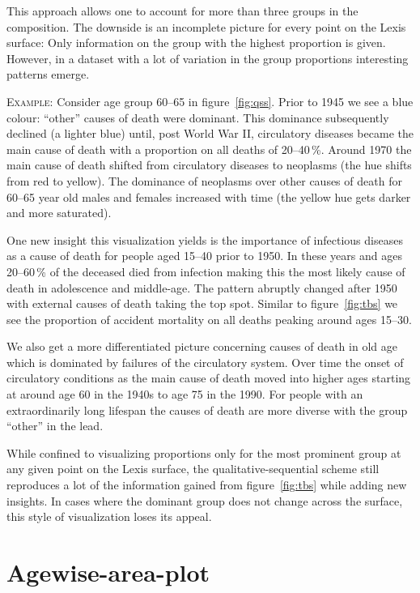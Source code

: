 \documentclass[parskip=half]{scrartcl}
\begin{document}
This approach allows one to account for more than three groups in the composition. The downside is an incomplete picture for every point on the Lexis surface: Only information on the group with the highest proportion is given. However, in a dataset with a lot of variation in the group proportions interesting patterns emerge.

\textsc{Example:} Consider age group 60--65 in figure~\ref{fig:qss}. Prior to 1945 we see a blue colour: \enquote{other} causes of death were dominant. This dominance subsequently declined (a lighter blue) until, post World War II, circulatory diseases became the main cause of death with a proportion on all deaths of 20--40\,\%. Around 1970 the main cause of death shifted from circulatory diseases to neoplasms (the hue shifts from red to yellow). The dominance of neoplasms over other causes of death for 60--65 year old males and females increased with time (the yellow hue gets darker and more saturated).

One new insight this visualization yields is the importance of infectious diseases as a cause of death for people aged 15--40 prior to 1950. In these years and ages 20--60\,\% of the deceased died from infection making this the most likely cause of death in adolescence and middle-age. The pattern abruptly changed after 1950 with external causes of death taking the top spot. Similar to figure~\ref{fig:tbs} we see the proportion of accident mortality on all deaths peaking around ages 15--30.

We also get a more differentiated picture concerning causes of death in old age which is dominated by failures of the circulatory system. Over time the onset of circulatory conditions as the main cause of death moved into higher ages starting at around age 60 in the 1940s to age 75 in the 1990. For people with an extraordinarily long lifespan the causes of death are more diverse with the group \enquote{other} in the lead.

While confined to visualizing proportions only for the most prominent group at any given point on the Lexis surface, the qualitative-sequential scheme still reproduces a lot of the information gained from figure~\ref{fig:tbs} while adding new insights. In cases where the dominant group does not change across the surface, this style of visualization loses its appeal.

\clearpage

\section{Agewise-area-plot} %
\label{sec:aag}
\end{document}
